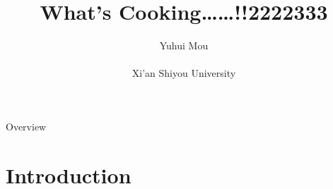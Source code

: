 \documentclass[
 size=14pt,
 paper=smartboard,  %
 mode=present, 		%
 display=slides, 	%
 style=tuliplab,  	%
 pauseslide,
 fleqn,leqno]{powerdot}
\title{What's Cooking……!!2222333} %
\author{
Yuhui Mou
\\
\\Xi'an Shiyou University
} %
\newcommand\twotonebox[2]{\fcolorbox{pdcolor2}{pdcolor2}
{#1\vphantom{#2}}\fcolorbox{pdcolor2}{white}{#2\vphantom{#1}}}
\begin{document}
\maketitle



\begin{slide}[toc=,bm=]{Overview}  %
\tableofcontents
\end{slide}


\section{Introduction} %



\end{document}
